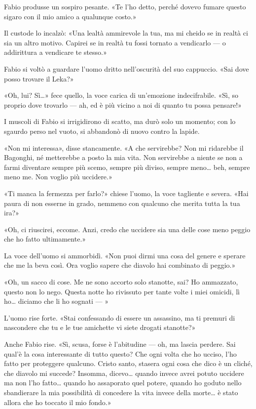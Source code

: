 Fabio produsse un sospiro pesante. «Te l'ho detto, perché dovevo fumare questo sigaro con il mio amico a qualunque costo.»

Il custode lo incalzò: «Una lealtà ammirevole la tua, ma mi cheido se in realtà ci sia un altro motivo. Capirei se in realtà tu fossi tornato a vendicarlo --- o addirittura a vendicare te stesso.»

Fabio si voltò a guardare l'uomo dritto nell'oscurità del suo cappuccio. «Sai dove posso trovare il Leka?»

«Oh, lui? Sì\ldots{}» fece quello, la voce carica di un'emozione indecifrabile. «Sì, so proprio dove trovarlo --- ah, ed è più vicino a noi di quanto tu possa pensare!»

I muscoli di Fabio si irrigidirono di scatto, ma durò solo un momento; con lo sgaurdo perso nel vuoto, si abbandonò di nuovo contro la lapide. 

«Non mi interessa», disse stancamente. «A che servirebbe? Non mi ridarebbe il Bagonghi, né metterebbe a posto la mia vita. Non servirebbe a niente se non a farmi diventare sempre più scemo, sempre più diviso, sempre meno\ldots{} beh, sempre meno me. Non voglio più uccidere.»

«Ti manca la fermezza per farlo?» chiese l'uomo, la voce tagliente e severa. «Hai paura di non esserne in grado, nemmeno con qualcuno che merita tutta la tua ira?»

«Oh, ci riuscirei, eccome. Anzi, credo che uccidere sia una delle cose meno peggio che ho fatto  ultimamente.»

La voce dell'uomo si ammorbidì. «Non puoi dirmi una cosa del genere e sperare che me la beva così. Ora voglio sapere che diavolo hai combinato di peggio.»

«Oh, un sacco di cose. Me ne sono accorto solo stanotte, sai? Ho ammazzato, questo non lo nego. Questa notte ho rivissuto per tante volte i miei omicidi, lì ho\ldots{} diciamo che li ho sognati --- »

L'uomo rise forte. «Stai confessando di essere un assassino, ma ti premuri di nascondere che tu e le tue amichette vi siete drogati stanotte?»

Anche Fabio rise. «Sì, scusa, forse è l'abitudine --- oh, ma lascia perdere. Sai qual'è la cosa interessante di tutto questo? Che ogni volta che ho ucciso, l'ho fatto per proteggere qualcuno. Cristo santo, stasera ogni cosa che dico è un cliché, che diavolo mi succede? Insomma, dicevo\ldots{} quando invece avrei potuto uccidere ma non l'ho fatto\ldots{} quando ho assaporato quel potere, quando ho goduto nello sbandierare la mia possibilità di concedere la vita invece della morte\ldots{} è stato allora che ho toccato il mio fondo.»

